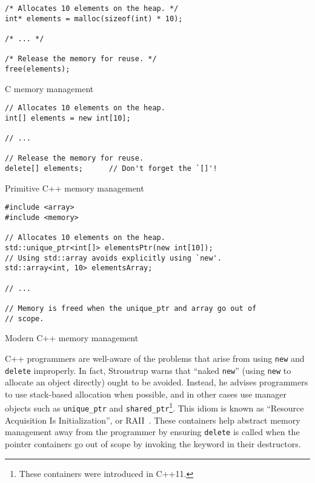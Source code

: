 \documentclass[finalcopy]{srpaper}
\begin{document}
\begin{listing}[H]
\begin{verbatim}
/* Allocates 10 elements on the heap. */
int* elements = malloc(sizeof(int) * 10);

/* ... */

/* Release the memory for reuse. */
free(elements);
\end{verbatim}
\caption{C memory management}
\label{lst:cmemory}
\end{listing}

\begin{listing}[H]
\begin{verbatim}
// Allocates 10 elements on the heap.
int[] elements = new int[10];

// ...

// Release the memory for reuse.
delete[] elements;      // Don't forget the `[]'!
\end{verbatim}
\caption{Primitive C++ memory management}
\label{lst:cppmemory}
\end{listing}

\begin{listing}
\begin{verbatim}
#include <array>
#include <memory>

// Allocates 10 elements on the heap.
std::unique_ptr<int[]> elementsPtr(new int[10]);
// Using std::array avoids explicitly using `new'.
std::array<int, 10> elementsArray;

// ...

// Memory is freed when the unique_ptr and array go out of
// scope.
\end{verbatim}
\label{lst:cppmodernmemory}
\caption{Modern C++ memory management}
\end{listing}

C++ programmers are well-aware of the problems that arise from using
\texttt{new} and \texttt{delete} improperly. In fact, Stroustrup warns that
``naked \texttt{new}'' (using \texttt{new} to allocate an object directly)
ought to be avoided. Instead, he advises programmers to use stack-based
allocation when possible, and in other cases use manager objects such as
\texttt{unique\_ptr} and \texttt{shared\_ptr}\footnote{These containers were
introduced in C++11.}. This idiom is known as ``Resource Acquisition Is
Initialization'', or RAII~\cite{stroustrup2013the}. These containers help
abstract memory management away from the programmer by ensuring \texttt{delete}
is called when the pointer containers go out of scope by invoking the keyword
in their destructors.
\end{document}
